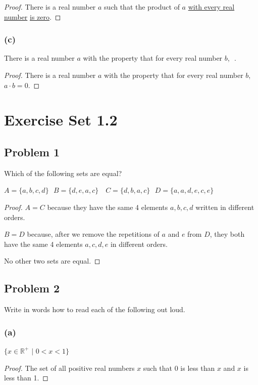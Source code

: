 \documentclass[14pt]{extarticle}
\newcommand{\fbl}{\underline{\hspace{1cm}}\,\,}
\newcommand{\R}{\mathbb{R}}
\begin{document}
\begin{proof}
There is a real number $a$ such that the product of $a$ \underline{with every
real number} \underline{is zero}.
\end{proof}

\subsubsection{(c)}
There is a real number $a$ with the property that for every real number $b$,
\fbl.

\begin{proof}
There is a real number $a$ with the property that for every real number $b$,
\underline{$a \cdot b = 0$}.
\end{proof}

\section{Exercise Set 1.2}

\subsection{Problem 1}
Which of the following sets are equal?

$A = \{a, b, c, d\} \,\,\,\, B = \{d, e, a, c\} \,\,\,\,$
$C = \{d, b, a, c\} \,\,\,\, D = \{a, a, d, e, c, e\}$

\begin{proof}
$A = C$ because they have the same 4 elements $a, b, c, d$ written in different
orders.

$B = D$ because, after we remove the repetitions of $a$ and $e$ from $D$, they
both have the same 4 elements $a, c, d, e$ in different orders.

No other two sets are equal.
\end{proof}

\subsection{Problem 2}
Write in words how to read each of the following out loud.

\subsubsection{(a)}
$\{x \in \R^+ \,\, | \,\, 0 < x < 1\}$

\begin{proof}
The set of all positive real numbers $x$ such that 0 is less than $x$ and $x$ is
less than 1.
\end{proof}
\end{document}
